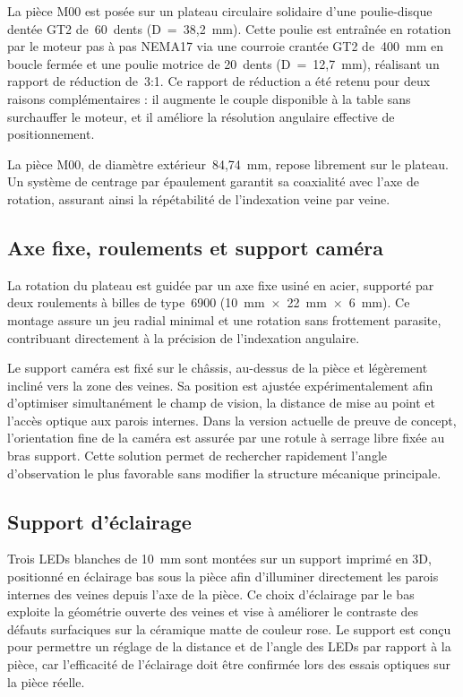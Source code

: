 La pièce M00 est posée sur un plateau circulaire solidaire d'une poulie-disque dentée GT2
de~60~dents (D~=~38,2~mm). Cette poulie est entraînée en rotation par le moteur pas à pas
NEMA17 via une courroie crantée GT2 de~400~mm en boucle fermée et une poulie motrice de
20~dents (D~=~12,7~mm), réalisant un rapport de réduction de~3:1. Ce rapport de réduction a
été retenu pour deux raisons complémentaires : il augmente le couple disponible à la table
sans surchauffer le moteur, et il améliore la résolution angulaire effective de positionnement.

La pièce M00, de diamètre extérieur~84,74~mm, repose librement sur le plateau. Un système
de centrage par épaulement garantit sa coaxialité avec l'axe de rotation, assurant ainsi
la répétabilité de l'indexation veine par veine.

\subsection{Axe fixe, roulements et support caméra}

La rotation du plateau est guidée par un axe fixe usiné en acier, supporté par deux roulements
à billes de type~6900 (10~mm~$\times$~22~mm~$\times$~6~mm). Ce montage assure un jeu radial
minimal et une rotation sans frottement parasite, contribuant directement à la précision de
l'indexation angulaire.

Le support caméra est fixé sur le châssis, au-dessus de la pièce et légèrement incliné
vers la zone des veines. Sa position est ajustée expérimentalement afin d'optimiser
simultanément le champ de vision, la distance de mise au point et l'accès optique aux parois
internes. Dans la version actuelle de preuve de concept, l'orientation fine de la caméra est
assurée par une rotule à serrage libre fixée au bras support. Cette solution permet de
rechercher rapidement l'angle d'observation le plus favorable sans modifier la structure
mécanique principale.

\subsection{Support d'éclairage}

Trois LEDs blanches de 10~mm sont montées sur un support imprimé en 3D, positionné en
éclairage bas sous la pièce afin d'illuminer directement les parois internes des veines
depuis l'axe de la pièce. Ce choix d'éclairage par le bas exploite la géométrie ouverte des
veines et vise à améliorer le contraste des défauts surfaciques sur la céramique matte de
couleur rose. Le support est conçu pour permettre un réglage de la distance et de l'angle des
LEDs par rapport à la pièce, car l'efficacité de l'éclairage doit être confirmée lors des
essais optiques sur la pièce réelle.

